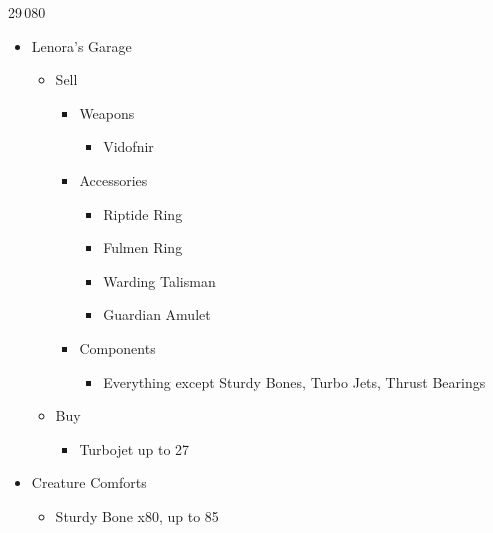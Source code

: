 	\begin{shop}{29\,080}
		\begin{itemize}
			\item Lenora's Garage
			      \begin{itemize}
				      \item Sell
				            \begin{itemize}
					            \item Weapons
					                  \begin{itemize}
						                  \item Vidofnir
					                  \end{itemize}
					            \item Accessories
					                  \begin{itemize}
						                  \item Riptide Ring
						                  \item Fulmen Ring
						                  \item Warding Talisman
						                  \item Guardian Amulet
					                  \end{itemize}
					            \item Components
					                  \begin{itemize}
						                  \item Everything except Sturdy Bones, Turbo Jets, Thrust Bearings
					                  \end{itemize}
				            \end{itemize}
				      \item Buy
				            \begin{itemize}
					            \item Turbojet up to 27
				            \end{itemize}
			      \end{itemize}
			\item Creature Comforts
			      \begin{itemize}
				      \item Sturdy Bone x80, up to 85
			      \end{itemize}
		\end{itemize}
	\end{shop}
	
